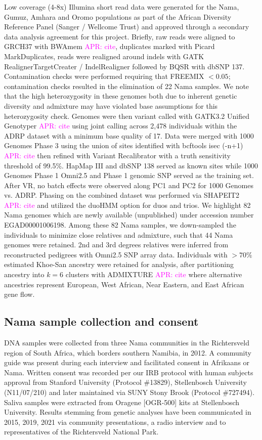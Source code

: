 \documentclass[]{article}
\newcommand{\aprcomment}[1]{{\textcolor{magenta}{APR: #1}}}
\begin{document}
Low coverage (4-8x) Illumina short read data were generated for the Nama,
Gumuz, Amhara and Oromo populations as part of the African Diversity Reference
Panel (Sanger / Wellcome Trust) \citep{Gurdasani2015-qy,Pagani2015-pz} and
approved through a secondary data analysis agreement for this project. Briefly,
raw reads were aligned to GRCH37 with BWAmem \aprcomment{cite}, duplicates
marked with Picard MarkDuplicates, reads were realigned around indels with GATK
RealignerTargetCreater / IndelRealigner followed by BQSR with dbSNP 137.
Contamination checks were performed requiring that FREEMIX $<0.05$;
contamination checks resulted in the elimination of 22 Nama samples. We note
that the high heterozygosity in these genomes both due to inherent genetic
diversity and admixture may have violated base assumptions for this
heterozygosity check. Genomes were then variant called with GATK3.2 Unified
Genotyper \aprcomment{cite} using joint calling across 2,478 individuals within
the ADRP dataset with a minimum base quality of 17. Data were merged with 1000
Genomes Phase 3 \citep{1000_Genomes_Project_Consortium2015-zq} using the union
of sites identified with bcftools isec (-n+1) \aprcomment{cite} then refined
with Variant Recalibrator with a truth sensitivity threshold of 99.5\%. HapMap
III and dbSNP 138 served as known sites while 1000 Genomes Phase 1 Omni2.5 and
Phase 1 genomic SNP served as the training set. After VR, no batch effects were
observed along PC1 and PC2 for 1000 Genomes vs. ADRP. Phasing on the combined
dataset was performed via SHAPEIT2 \aprcomment{cite} and utilized the duoHMM
option for duos and trios. We highlight 82 Nama genomes which are newly
available (unpublished) under accession number EGAD00001006198. Among these 82
Nama samples, we down-sampled the individuals to minimize close relatives and
admixture, such that 44 Nama genomes were retained. 2nd and 3rd degrees
relatives were inferred from reconstructed pedigrees with Omni2.5 SNP array
data. Individuals with $>70\%$ estimated Khoe-San ancestry were retained for
analysis, after partitioning ancestry into $k=6$ clusters with ADMIXTURE
\aprcomment{cite} where alternative ancestries represent European, West
African, Near Eastern, and East African gene flow. 

\subsection{Nama sample collection and consent}

DNA samples were collected from three Nama communities in the Richtersveld
region of South Africa, which borders southern Namibia, in 2012. A community
guide was present during each interview and facilitated consent in Afrikaans or
Nama. Written consent was recorded per our IRB protocol with human subjects
approval from Stanford University (Protocol \#13829), Stellenbosch University
(N11/07/210) and later maintained via SUNY Stony Brook (Protocol \#727494).
Saliva samples were extracted from Oragene [OGR-500] kits at Stellenbosch
University. Results stemming from genetic analyses have been communicated in
2015, 2019, 2021 via community presentations, a radio interview and to
representatives of the Richtersveld National Park.
\end{document}
